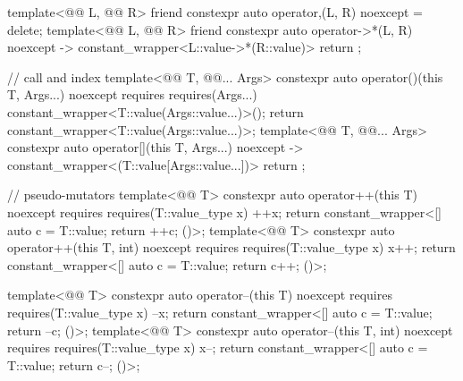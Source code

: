 \begin{codeblock}
{  template<@@ L, @@ R>
    friend constexpr auto operator,(L, R) noexcept = delete;
  template<@@ L, @@ R>
    friend constexpr auto operator->*(L, R) noexcept -> constant_wrapper<L::value->*(R::value)>
      { return {}; }

  // call and index
  template<@@ T, @@... Args>
    constexpr auto operator()(this T, Args...) noexcept
      requires requires(Args...) { constant_wrapper<T::value(Args::value...)>(); }
        { return constant_wrapper<T::value(Args::value...)>{}; }
  template<@@ T, @@... Args>
    constexpr auto operator[](this T, Args...) noexcept
      -> constant_wrapper<(T::value[Args::value...])>
        { return {}; }

  // pseudo-mutators
  template<@@ T>
    constexpr auto operator++(this T) noexcept
      requires requires(T::value_type x) { ++x; }
        { return constant_wrapper<[] { auto c = T::value; return ++c; }()>{}; }
  template<@@ T>
    constexpr auto operator++(this T, int) noexcept
      requires requires(T::value_type x) { x++; }
        { return constant_wrapper<[] { auto c = T::value; return c++; }()>{}; }

  template<@@ T>
    constexpr auto operator--(this T) noexcept
      requires requires(T::value_type x) { --x; }
        { return constant_wrapper<[] { auto c = T::value; return --c; }()>{}; }
  template<@@ T>
    constexpr auto operator--(this T, int) noexcept
      requires requires(T::value_type x) { x--; }
        { return constant_wrapper<[] { auto c = T::value; return c--; }()>{}; }

}
\end{codeblock}

